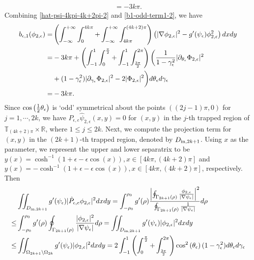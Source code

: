 \documentclass[1 [leqno, 11pt]{amsart}
\numberwithin{equation}{section}
\let\ep=\epsilon
\let\pa=\partial
\begin{document}
\begin{CJK*}{GBK}{song}
\begin{align}
= -3k\pi.
\end{align}
Combining \eqref{hat-psi-4kpi-4k+2pi-2} and \eqref{b1-odd-term1-2}, we have
\begin{align}\nonumber
b_{\ep,1}(\phi_{2,\ep})
=&  \left( \int_{-\infty}^{+\infty} \int_0^{4k\pi}+\int_{-\infty}^{+\infty} \int_{4k\pi}^{(4k+2)\pi}\right)\left(
|\nabla {\phi}_{2,\ep}|^2 - g'(\psi_\epsilon){\phi}_{2,\ep}^2\right) dx dy\\\nonumber
=& -3k\pi+\left(\int_{-1}^1\int_0^{{\pi\over2}}+\int_{-1}^1\int_{3\pi\over2}^{2\pi}\right)\bigg(
{1\over1-\gamma_\ep^2}|\pa_{\theta_\ep}\Phi_{2,\ep}|^2\\\nonumber
&+(1-\gamma_\ep^2)|\pa_{\gamma_\ep}\Phi_{2,\ep}|^2-2|\Phi_{2,\ep}|^2\bigg)d\theta_\ep d\gamma_\ep\\\label{com-b-ep-1-phi-2-ep}
=&-3k\pi.
\end{align}
Since
$\cos\left({1\over 2}\theta_\ep\right)$ is  `odd'   symmetrical about the points $((2j-1)\pi,0)$  for $j=1,\cdots,2k$,  we have
$\hat{P}_{\ep,e} \hat{\psi}_{2,\ep}(x,y)=0$ for $(x,y)$ in the $j$-th trapped region of
$\mathbb{T}_{(4k+2)\pi}\times \mathbb{R}$, where $1\leq j\leq2k$.
Next, we compute the projection term for $(x,y)$ in  the $(2k+1)$-th trapped region, denoted by $D_{{\rm{in}},2k+1}$.
Using $x$ as the parameter,
we  represent the upper and lower  separatrix to be $y(x)=\cosh^{-1}(1+\ep-\ep\cos(x)), x\in[4k\pi,(4k+2)\pi]$ and  $y(x)=-\cosh^{-1}(1+\ep-\ep\cos(x)), x\in[4k\pi,(4k+2)\pi]$, respectively.
Then
\begin{align*}
&\iint_{D_{{\rm{in}},2k+1}} g'(\psi_\ep) |\hat{P}_{\ep,e} {\phi}_{2,\ep}|^2 dxdy
=\int_{-\rho_0}^{\rho_0} g'(\rho)  \frac{\left|\oint_{\Gamma_{2k+1} (\rho)} \frac{{\phi}_{2,\ep}}{|\nabla \psi_\ep|}\right|^2}{\oint_{\Gamma_{2k+1} (\rho)} \frac{1}{|\nabla\psi_\ep|}} d\rho\\
\leq&\int_{-\rho_0}^{\rho_0} g'(\rho) \oint_{\Gamma_{2k+1} (\rho)} \frac{|{\phi}_{2,\ep}|^2}{|\nabla \psi_\ep|}d\rho= \iint_{D_{{\rm{in}},2k+1}} g'(\psi_\ep) | {\phi}_{2,\ep}|^2 dxdy\\
\leq &\iint_{\Omega_{2k+1}\setminus\Omega_{2k}}g'(\psi_\ep)| {\phi}_{2,\ep}|^2dxdy
=2\int_{-1}^1\left(\int_0^{\pi\over 2}+\int_{3\pi\over2}^{2\pi}\right)\cos^2\left(\theta_\ep\right)(1-\gamma_\ep^2)d\theta_\ep d\gamma_\ep\\

\end{align*}
\end{CJK*}
\end{document}
